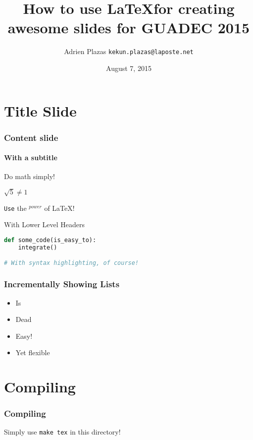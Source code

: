 \documentclass{beamer}
\title[How to use \LaTeX for GUADEC 2015]{How to use \LaTeX for creating awesome slides for GUADEC 2015}
\author{Adrien Plazas \texttt{kekun.plazas@laposte.net}}
\date{August 7, 2015}
\begin{document}
\begin{frame}
\titlepage
\end{frame}

\section{Title Slide}

\begin{frame}[containsverbatim]
\frametitle{Content slide}
\framesubtitle{With a subtitle}

    Do math simply!

    \begin{center}
        $\sqrt{5} \neq 1$
    \end{center}

    \texttt{Use} the $^{power}$ of \LaTeX!

    \begin{block}{With Lower Level Headers}
        \begin{lstlisting}[language=Python]
def some_code(is_easy_to):
    integrate()

# With syntax highlighting, of course!
        \end{lstlisting}
    \end{block}
\end{frame}

\begin{frame}
\frametitle{Incrementally Showing Lists}

    \begin{itemize}
        \item<1-> Is
        \item<2-| alert@2> Dead
        \item<3-> Easy!
        \item<1-> Yet flexible
    \end{itemize}
\end{frame}

\section{Compiling}

\begin{frame}
\frametitle{Compiling}

    Simply use \texttt{make tex} in this directory!
\end{frame}
\end{document}
